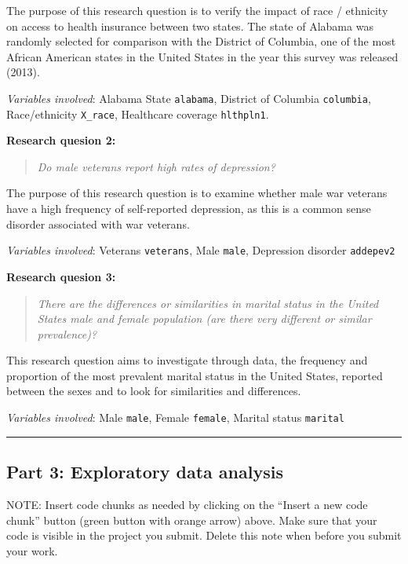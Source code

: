 \documentclass[]{article}
\begin{document}
The purpose of this research question is to verify the impact of race /
ethnicity on access to health insurance between two states. The state of
Alabama was randomly selected for comparison with the District of
Columbia, one of the most African American states in the United States
in the year this survey was released (2013).

\emph{Variables involved}: Alabama State \texttt{alabama}, District of
Columbia \texttt{columbia}, Race/ethnicity \texttt{X\_race}, Healthcare
coverage \texttt{hlthpln1}.

\textbf{Research quesion 2:}

\begin{quote}
\emph{Do male veterans report high rates of depression?}
\end{quote}

The purpose of this research question is to examine whether male war
veterans have a high frequency of self-reported depression, as this is a
common sense disorder associated with war veterans.

\emph{Variables involved}: Veterans \texttt{veterans}, Male
\texttt{male}, Depression disorder \texttt{addepev2}

\textbf{Research quesion 3:}

\begin{quote}
\emph{There are the differences or similarities in marital status in the
United States male and female population (are there very different or
similar prevalence)?}
\end{quote}

This research question aims to investigate through data, the frequency
and proportion of the most prevalent marital status in the United
States, reported between the sexes and to look for similarities and
differences.

\emph{Variables involved}: Male \texttt{male}, Female \texttt{female},
Marital status \texttt{marital}

\begin{center}\rule{0.5\linewidth}{\linethickness}\end{center}

\hypertarget{part-3-exploratory-data-analysis}{%
\subsection{Part 3: Exploratory data
analysis}\label{part-3-exploratory-data-analysis}}

NOTE: Insert code chunks as needed by clicking on the ``Insert a new
code chunk'' button (green button with orange arrow) above. Make sure
that your code is visible in the project you submit. Delete this note
when before you submit your work.
\end{document}
